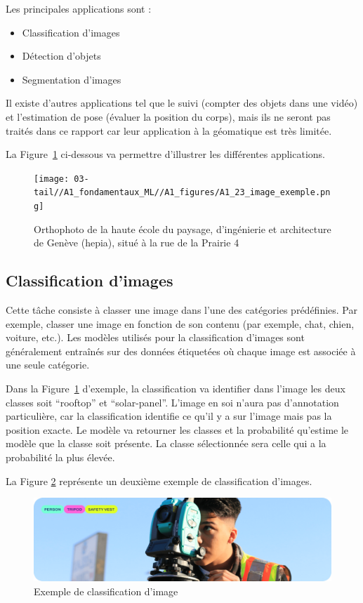 Les principales applications sont :
\begin{itemize}
    \item Classification d'images
    \item Détection d'objets
    \item Segmentation d'images
\end{itemize}

Il existe d'autres applications tel que le suivi (compter des objets dans une vidéo) et l'estimation de pose (évaluer la position du corps), mais ils ne seront pas traités dans ce rapport car leur application à la géomatique est très limitée.

\newpage
La Figure~\ref{fig:A1_23_image_exemple} ci-dessous va permettre d'illustrer les différentes applications.

\begin{figure}[H]
    \centering
    \texttt{[image: 03-tail//A1\_fondamentaux\_ML//A1\_figures/A1\_23\_image\_exemple.png]}
    \caption{Orthophoto de la haute école du paysage, d’ingénierie et architecture de Genève (hepia), situé à la rue de la Prairie 4}
    \label{fig:A1_23_image_exemple}
\end{figure}

\subsection{Classification d'images}

Cette tâche consiste à classer une image dans l'une des catégories prédéfinies. Par exemple, classer une image en fonction de son contenu (par exemple, chat, chien, voiture, etc.). Les modèles utilisés pour la classification d'images sont généralement entraînés sur des données étiquetées où chaque image est associée à une seule catégorie.

Dans la Figure~\ref{fig:A1_23_image_exemple} d'exemple, la classification va identifier dans l'image les deux classes soit ``rooftop'' et ``solar-panel''. L'image en soi n'aura pas d'annotation particulière, car la classification identifie ce qu'il y a sur l'image mais pas la position exacte. Le modèle va retourner les classes et la probabilité qu'estime le modèle que la classe soit présente. La classe sélectionnée sera celle qui a la probabilité la plus élevée.

La Figure \ref{fig:A1_24_classification} représente un deuxième exemple de classification d'images.

\begin{figure}[H]
    \centering
    \includegraphics[width=1\linewidth]{03-tail//A1_fondamentaux_ML//A1_figures/A1_24_classification.png}
    \caption{Exemple de classification d'image \cite{ultralytics_classer_nodate}}
    \label{fig:A1_24_classification}
\end{figure}

